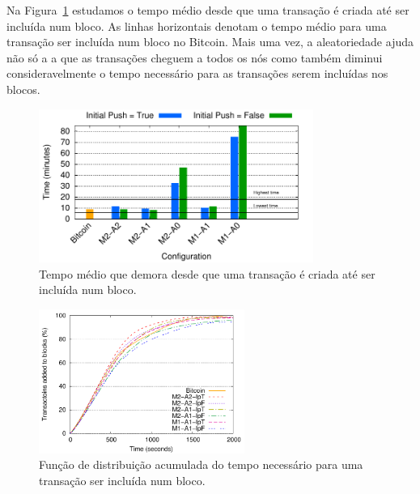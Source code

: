 Na Figura~\ref{fig:commit-time} estudamos o tempo médio desde que uma transação é criada até ser incluída num bloco. As linhas horizontais denotam o tempo médio para uma transação ser incluída num bloco no Bitcoin.
Mais uma vez, a aleatoriedade ajuda não só a a que as transações cheguem a todos os nós como também diminui consideravelmente o tempo necessário para as transações serem incluídas nos blocos.
\vspace{-0.6cm}

\begin{figure}
\centering
\includegraphics[width=0.8\textwidth]{plots/imp/commit-time.pdf}
\caption{Tempo médio que demora desde que uma transação é criada até ser incluída num bloco.}
\label{fig:commit-time}
\vspace{-1.5cm}
\end{figure}


\begin{figure}
\centering
\includegraphics[width=0.6\textwidth]{plots/imp/cdf_commit.pdf}
\caption{Função de distribuição acumulada do tempo necessário para uma transação ser incluída num bloco.}
\label{fig:cdf-commit}
\vspace{-0.5cm}
\end{figure}

